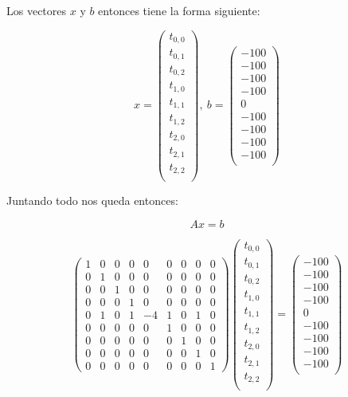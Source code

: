 Los vectores $x$ y $b$ entonces tiene la forma siguiente:

\[ x =  \left( \begin{array}{c}
t_{0,0} \\
t_{0,1} \\
t_{0,2} \\
t_{1,0} \\
t_{1,1} \\
t_{1,2} \\
t_{2,0} \\
t_{2,1} \\
t_{2,2} \\
\end{array} \right), \  b = \left( \begin{array}{c}
-100 \\
-100 \\
-100 \\
-100 \\
0 \\
-100 \\
-100 \\
-100 \\
-100 \\
\end{array} \right)
\] 

Juntando todo nos queda entonces:

\[ Ax = b \]

$$
\left( \begin{array}{ccccccccc}
1 & 0 & 0 & 0 & 0 & 0 & 0 & 0 & 0 \\
0 & 1 & 0 & 0 & 0 & 0 & 0 & 0 & 0 \\
0 & 0 & 1 & 0 & 0 & 0 & 0 & 0 & 0 \\ 
0 & 0 & 0 & 1 & 0 & 0 & 0 & 0 & 0 \\
0 & 1 & 0 & 1 & -4 & 1 & 0 & 1 & 0 \\
0 & 0 & 0 & 0 & 0 & 1 & 0 & 0 & 0 \\ 
0 & 0 & 0 & 0 & 0 & 0 & 1 & 0 & 0 \\
0 & 0 & 0 & 0 & 0 & 0 & 0 & 1 & 0 \\
0 & 0 & 0 & 0 & 0 & 0 & 0 & 0 & 1
\end{array} \right)	\left( \begin{array}{c}
t_{0,0} \\
t_{0,1} \\
t_{0,2} \\
t_{1,0} \\
t_{1,1} \\
t_{1,2} \\
t_{2,0} \\
t_{2,1} \\
t_{2,2} \\
\end{array} \right) = \left( \begin{array}{c}
-100 \\
-100 \\
-100 \\
-100 \\
0 \\
-100 \\
-100 \\
-100 \\
-100 \\
\end{array} \right)
$$


